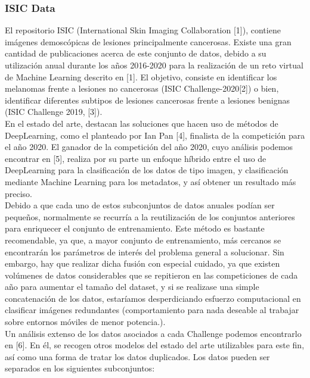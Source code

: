\subsubsection{ISIC Data}
El repositorio ISIC (International Skin Imaging Collaboration [1]), contiene imágenes demoscópicas de lesiones principalmente cancerosas.  Existe una gran cantidad de publicaciones acerca de este conjunto de datos, debido a su utilización anual durante los años 2016-2020 para la realización de un reto virtual de Machine Learning descrito en [1]. El objetivo, consiste en identificar los melanomas frente a lesiones no cancerosas (ISIC Challenge-2020[2]) o bien, identificar diferentes subtipos de lesiones cancerosas frente a lesiones benignas (ISIC Challenge 2019, [3]). \\

En el estado del arte, destacan las soluciones que hacen uso de métodos de DeepLearning, como el planteado por Ian Pan [4], finalista de la competición para el año 2020. El ganador de la competición del año 2020, cuyo análisis podemos encontrar en [5], realiza por su parte un enfoque híbrido entre el uso de DeepLearning para la clasificación de los datos de tipo imagen, y clasificación mediante Machine Learning para los metadatos, y así obtener un resultado más preciso. \\

Debido a que cada uno de estos subconjuntos de datos anuales podían ser pequeños, normalmente se recurría a la reutilización de los conjuntos anteriores para enriquecer el conjunto de entrenamiento.  Este método es bastante recomendable, ya que, a mayor conjunto de entrenamiento, más cercanos se encontrarán los parámetros de interés del problema general a solucionar. Sin embargo, hay que realizar dicha fusión con especial cuidado, ya que existen volúmenes de datos considerables que se repitieron en las competiciones de cada año para aumentar el tamaño del dataset, y si se realizase una simple concatenación de los datos, estaríamos desperdiciando esfuerzo computacional en clasificar imágenes redundantes (comportamiento para nada deseable al trabajar sobre entornos móviles de menor potencia.).\\

Un análisis extenso de los datos asociados a cada Challenge podemos encontrarlo en [6]. En él, se recogen otros modelos del estado del arte utilizables para este fin, así como una forma de tratar los datos duplicados. Los datos pueden ser separados en los siguientes subconjuntos:

